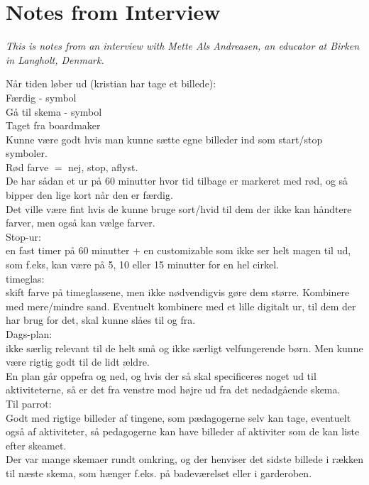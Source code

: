 \chapter{Notes from Interview}
\label{InterviewMette}
\textit{This is notes from an interview with Mette Als Andreasen, an educator at Birken in Langholt, Denmark.}

N\aa{}r tiden l\o{}ber ud (kristian har tage et billede):\\
F\ae{}rdig - symbol\\
G\aa{} til skema - symbol\\
Taget fra boardmaker\\

Kunne v\ae{}re godt hvis man kunne s\ae{}tte egne billeder ind som start/stop symboler.\\


R\o{}d farve $=$ nej, stop, aflyst.\\

De har s\aa{}dan et ur p\aa{} 60 minutter hvor tid tilbage er markeret med r\o{}d, og s\aa{} bipper den lige kort n\aa{}r den er f\ae{}rdig.\\
  Det ville v\ae{}re fint hvis de kunne bruge sort/hvid til dem der ikke kan h\aa{}ndtere farver, men ogs\aa{} kan v\ae{}lge farver.\\

Stop-ur:\\
en fast timer p\aa{} 60 minutter $+$ en customizable som ikke ser helt magen til ud, som f.eks, kan v\ae{}re p\aa{} 5, 10 eller 15 minutter for en hel cirkel.\\

timeglas:\\
skift farve p\aa{} timeglassene, men ikke n\o{}dvendigvis g\o{}re dem st\o{}rre. Kombinere med mere/mindre sand. Eventuelt kombinere med et lille digitalt ur, til dem der har brug for det, skal kunne sl\aa{}es til og fra.\\

Dags-plan:\\
ikke s\ae{}rlig relevant til de helt sm\aa{} og ikke s\ae{}rligt velfungerende b\o{}rn. Men kunne v\ae{}re rigtig godt til de lidt \ae{}ldre.\\
   En plan g\aa{}r oppefra og ned, og hvis der s\aa{} skal specificeres noget ud til aktiviteterne, s\aa{} er det fra venstre mod h\o{}jre ud fra det nedadg\aa{}ende skema.\\

Til parrot:\\
Godt med rigtige billeder af tingene, som p\ae{}dagogerne selv kan tage, eventuelt ogs\aa{} af aktiviteter, s\aa{} pedagogerne kan have billeder af aktiviter som de kan liste efter skeamet.\\

Der var mange skemaer rundt omkring, og der henviser det sidste billede i r\ae{}kken til n\ae{}ste skema, som h\ae{}nger f.eks. p\aa{} badev\ae{}relset eller i garderoben.
